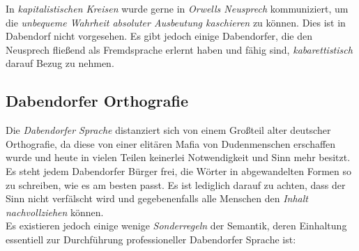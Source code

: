 In \textit{kapitalistischen Kreisen} wurde gerne in \textit{Orwells Neusprech} kommuniziert, um die \textit{unbequeme Wahrheit absoluter Ausbeutung kaschieren} zu können. Dies ist in Dabendorf nicht vorgesehen. Es gibt jedoch einige Dabendorfer, die den Neusprech fließend als Fremdsprache erlernt haben und fähig sind, \textit{kabarettistisch} darauf Bezug zu nehmen.

\subsection{{Dabendorfer Orthografie}}
Die \textit{Dabendorfer Sprache} distanziert sich von einem Großteil alter deutscher Orthografie, da diese von einer elitären Mafia von Dudenmenschen erschaffen wurde und heute in vielen Teilen keinerlei Notwendigkeit und Sinn mehr besitzt. Es steht jedem Dabendorfer Bürger frei, die Wörter in abgewandelten Formen so zu schreiben, wie es am besten passt. Es ist lediglich darauf zu achten, dass der Sinn nicht verfälscht wird und gegebenenfalls alle Menschen den \textit{Inhalt nachvollziehen} können.\\
Es existieren jedoch einige wenige \textit{Sonderregeln} der Semantik, deren Einhaltung essentiell zur Durchführung professioneller Dabendorfer Sprache ist:
